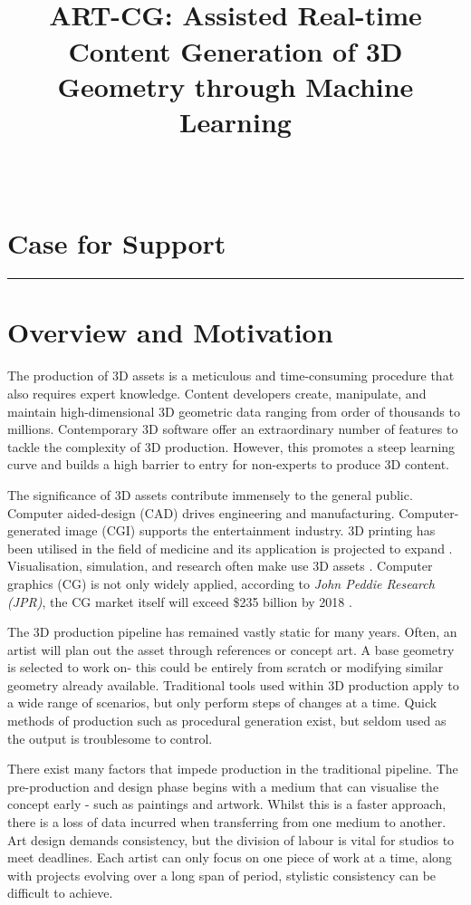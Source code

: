 \documentclass[a4paper, fontsize=15pt, onecolumn]{article} %
\title{
	\vspace{-3.0cm}
	\horrule{0.4pt} \\[0.2cm] %
	\vspace{0.2cm}
	\Large ART-CG: Assisted Real-time Content Generation of 3D Geometry through Machine Learning\\
	\horrule{0.4pt} \\[0cm] %
	\vspace{-0.5cm}
}
\date{} %
\numberwithin{equation}{section} %
\numberwithin{figure}{section} %
\numberwithin{table}{section} %
\begin{document}
\maketitle
\thispagestyle{fancy} %

\section*{Case for Support}
\hrule
\section{Overview and Motivation}
The production of 3D assets is a meticulous and time-consuming procedure that also requires expert knowledge. Content developers create, manipulate, and maintain high-dimensional 3D geometric data ranging from order of thousands to millions. Contemporary 3D software offer an extraordinary number of features to tackle the complexity of 3D production. However, this promotes a steep learning curve and builds a high barrier to entry for non-experts to produce 3D content.

The significance of 3D assets contribute immensely to the general public.
Computer aided-design (CAD) drives engineering and manufacturing.
Computer-generated image (CGI) supports the entertainment industry.
3D printing has been utilised in the field of medicine and its application is projected to expand \cite{3dprinting}.
Visualisation, simulation, and research often make use 3D assets \cite{simulation}.
Computer graphics (CG) is not only widely applied, according to \textit{John Peddie Research (JPR)}, the CG market itself will exceed \$235 billion by 2018 \cite{cgmarket}.

The 3D production pipeline has remained vastly static for many years. Often, an artist will plan out the asset through references or concept art. A base geometry is selected to work on- this could be entirely from scratch or modifying similar geometry already available. Traditional tools used within 3D production apply to a wide range of scenarios, but only perform steps of changes at a time. 
Quick methods of production such as procedural generation exist, but seldom used as the output is troublesome to control.

There exist many factors that impede production in the traditional pipeline. The pre-production and design phase begins with a medium that can visualise the concept early - such as paintings and artwork. Whilst this is a faster approach, there is a loss of data incurred when transferring from one medium to another. Art design demands consistency, but the division of labour is vital for studios to meet deadlines. Each artist can only focus on one piece of work at a time, along with projects evolving over a long span of period, stylistic consistency can be difficult to achieve. 
\end{document}
